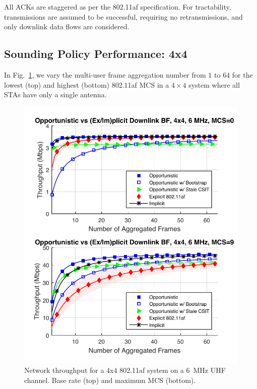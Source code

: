 
 All \acp{ACK} are staggered as per the 802.11af specification.
 For tractability, transmissions are assumed to be successful, requiring no retransmissions, and only downlink data flows are considered.


\subsection{Sounding Policy Performance: 4x4}
\label{sec:4x4_policy}
 
 In Fig.~\ref{fig:protosim_4x4}, we vary the multi-user frame aggregation number from $1$ to $64$ for the lowest (top) and highest (bottom) 802.11af \ac{MCS} in a $4\times 4$ system where all \acp{STA} have only a single antenna.

\begin{figure}[t] %
\centering
\includegraphics[width=0.7\linewidth]{./figs/protocol/tput_vs_agg_4x4_6mhz_im_mcs-0_crop}
\caption{Network throughput for a 4x4 802.11af system on a 6~MHz UHF channel. Base rate (top) and maximum \ac{MCS} (bottom).}
\label{fig:protosim_4x4}
\end{figure}


